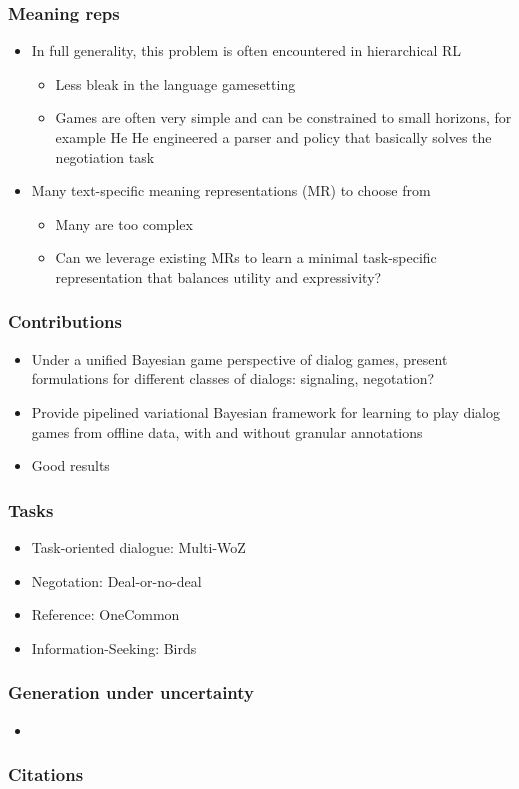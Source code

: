 \documentclass{beamer}
\begin{document}
\begin{frame}
\frametitle{Meaning reps}
\begin{itemize}
\item In full generality, this problem is often encountered in hierarchical RL
    \begin{itemize}
    \item Less bleak in the language gamesetting
    \item Games are often very simple and can be constrained to small horizons,
        for example He He engineered a parser and policy that basically solves
        the negotiation task
    \end{itemize}
\item Many text-specific meaning representations (MR) to choose from
    \begin{itemize}
    \item Many are too complex
    \item Can we leverage existing MRs to learn a minimal task-specific
        representation that balances utility and expressivity?
    \end{itemize}
\end{itemize}
\end{frame}


\begin{frame}
\frametitle{Contributions}
\begin{itemize}
\item Under a unified Bayesian game perspective of dialog games,
    present formulations for different classes of dialogs:
    signaling, negotation?
\item Provide pipelined variational Bayesian framework for learning
    to play dialog games from offline data,
    with and without granular annotations
\item Good results
\end{itemize}
\end{frame}

\begin{frame}
\frametitle{Tasks}
\begin{itemize}
\item Task-oriented dialogue: Multi-WoZ
\item Negotation: Deal-or-no-deal
\item Reference: OneCommon
\item Information-Seeking: Birds
\end{itemize}
\end{frame}

\begin{frame}
\frametitle{Generation under uncertainty}
\begin{itemize}
\item \cite{lemon2010uncertain-generation}
\end{itemize}
\end{frame}

\begin{frame}[allowframebreaks]
\frametitle{Citations}

\end{frame}
\end{document}
